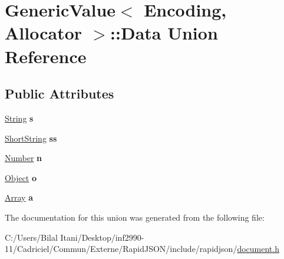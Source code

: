 \hypertarget{union_generic_value_1_1_data}{}\section{Generic\+Value$<$ Encoding, Allocator $>$\+:\+:Data Union Reference}
\label{union_generic_value_1_1_data}
\subsection*{Public Attributes}
\begin{DoxyCompactItemize}
\item 
\hyperlink{struct_generic_value_1_1_string}{String} {\bfseries s}\hypertarget{union_generic_value_1_1_data_a6872a4b93763944063b425e6c001ed2b}{}\label{union_generic_value_1_1_data_a6872a4b93763944063b425e6c001ed2b}

\item 
\hyperlink{struct_generic_value_1_1_short_string}{Short\+String} {\bfseries ss}\hypertarget{union_generic_value_1_1_data_a410e39a5dc296eb3b152b54193740e4c}{}\label{union_generic_value_1_1_data_a410e39a5dc296eb3b152b54193740e4c}

\item 
\hyperlink{union_generic_value_1_1_number}{Number} {\bfseries n}\hypertarget{union_generic_value_1_1_data_a243007cce2f4b75bea3e3c1ee4c3c239}{}\label{union_generic_value_1_1_data_a243007cce2f4b75bea3e3c1ee4c3c239}

\item 
\hyperlink{struct_generic_value_1_1_object}{Object} {\bfseries o}\hypertarget{union_generic_value_1_1_data_a15c6847aa3272560aaff5e7ed4320a7f}{}\label{union_generic_value_1_1_data_a15c6847aa3272560aaff5e7ed4320a7f}

\item 
\hyperlink{struct_generic_value_1_1_array}{Array} {\bfseries a}\hypertarget{union_generic_value_1_1_data_a1935b99b33ec9deff9f6360f8fa7b812}{}\label{union_generic_value_1_1_data_a1935b99b33ec9deff9f6360f8fa7b812}

\end{DoxyCompactItemize}


The documentation for this union was generated from the following file\+:\begin{DoxyCompactItemize}
\item 
C\+:/\+Users/\+Bilal Itani/\+Desktop/inf2990-\/11/\+Cadriciel/\+Commun/\+Externe/\+Rapid\+J\+S\+O\+N/include/rapidjson/\hyperlink{document_8h}{document.\+h}\end{DoxyCompactItemize}
